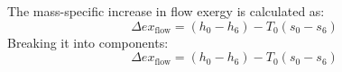The mass-specific increase in flow exergy is calculated as:  
\[
\Delta ex_{\text{flow}} = (h_0 - h_6) - T_0 (s_0 - s_6)
\]  
Breaking it into components:  
\[
\Delta ex_{\text{flow}} = (h_0 - h_6) - T_0 (s_0 - s_6)
\]